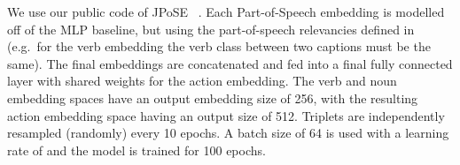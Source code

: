 \documentclass[twocolumn]{svjour3}          \smartqed
\begin{document}
We use our public code of JPoSE~\cite{wray2019fine} . 
Each Part-of-Speech embedding is modelled off of the MLP baseline, but using the part-of-speech relevancies defined in~\cite{wray2019fine} (e.g.~for the verb embedding the verb class between two captions must be the same).
The final embeddings are concatenated and fed into a final fully connected layer with shared weights for the action embedding.
The verb and noun embedding spaces have an output embedding size of 256, with the resulting action embedding space having an output size of 512.
Triplets are independently resampled (randomly) every 10 epochs.
A batch size of 64 is used with a learning rate of  and the model is trained for 100 epochs.
\end{document}
